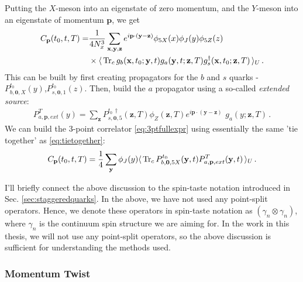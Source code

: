Putting the $X$-meson into an eigenstate of zero momentum, and the $Y$-meson into an eigenstate of momentum ${\textbf{p}}$, we get
\begin{align}
  \nonumber
  C_{\textbf{p}}(t_0,t,T) =& {1\over 4 N_x^3} \sum_{{\textbf{x}},{\textbf{y}},{\textbf{z}}} e^{i{\textbf{p}}\cdot({\textbf{y}}-{\textbf{z}})} \phi_{5X}(x) \phi_J(y) \phi_{5Z}(z) \\ &\times\langle\, \text{Tr}_c\, g_{b}({\textbf{x}},t_0;{\textbf{y}},t) g_{a}({\textbf{y}},t;{\textbf{z}},T) g^{\dagger}_{s}({\textbf{x}},t_0;{\textbf{z}},T) \,\rangle_U\,.
  \label{eq:3ptfullexpr}
\end{align}
This can be built by first creating propagators for the $b$ and $s$ quarks - $P^{t_0}_{b,{\textbf{0}},X}(y)$,$P^{t_0}_{s,{\textbf{0}},1}(z)$. Then, build the $a$ propagator using a so-called {\textit{extended source}}:
\begin{align}
  P^T_{a,{\textbf{p}},ext}(y) = \sum_{{\textbf{z}}} P^{t_0\,\dagger}_{s,{\textbf{0}},5}({\textbf{z}},T) \phi_{Z}({\textbf{z}},T) e^{i{\textbf{p}}\cdot({\textbf{y}}-{\textbf{z}})}\,\,g_{a}(y;{\textbf{z}},T)\,.
\end{align}
We can build the 3-point correlator \eqref{eq:3ptfullexpr} using essentially the same 'tie together' as \eqref{eq:tietogether}:
\begin{align}
  C_{\textbf{p}}(t_0,t,T) = {1\over 4}\sum_{\textbf{y}} \phi_J(y) \langle\,\text{Tr}_c\, P^{t_0}_{b,{\textbf{0}},5X}({\textbf{y}},t) P^T_{a,{\textbf{p}},ext}({\textbf{y}},t) \,\rangle_U\,.
\end{align}

I'll briefly connect the above discussion to the spin-taste notation introduced in Sec. \ref{sec:staggeredquarks}. In the above, we have not used any point-split operators. Hence, we denote these operators in spin-taste notation as $(\gamma_n\otimes \gamma_n)$, where $\gamma_n$ is the continuum spin structure we are aiming for. In the work in this thesis, we will not use any point-split operators, so the above discussion is sufficient for understanding the methods used.

\subsubsection{Momentum Twist}
\label{sec:momentum_twist}

